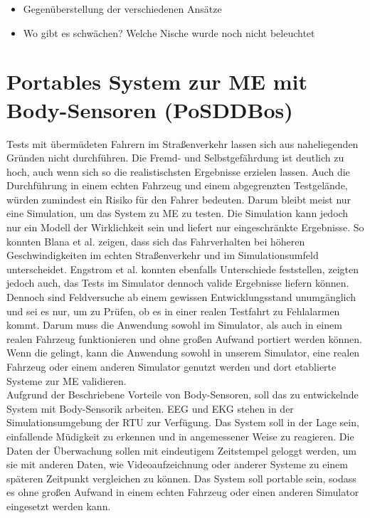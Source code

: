 {\begin{itemize}
  \item Gegenüberstellung der verschiedenen Ansätze
  \item Wo gibt es schwächen? Welche Nische wurde noch nicht beleuchtet
\end{itemize}

\section{Portables System zur \acl{ME} mit Body-Sensoren (PoSDDBos)}
\label{chap:prop}
Tests mit übermüdeten Fahrern im Straßenverkehr lassen sich aus naheliegenden Gründen nicht durchführen. Die Fremd- und Selbstgefährdung ist deutlich zu hoch, auch wenn sich so die realistischsten Ergebnisse erzielen lassen. Auch die Durchführung in einem echten Fahrzeug und einem abgegrenzten Testgelände, würden zumindest ein Risiko für den Fahrer bedeuten.
Darum bleibt meist nur eine Simulation, um das System zu \acl{ME} zu testen. Die Simulation kann jedoch nur ein Modell der Wirklichkeit sein und liefert nur eingeschränkte Ergebnisse. So konnten Blana et al. \cite{Blana_1} zeigen, dass sich das Fahrverhalten bei höheren Geschwindigkeiten im echten Straßenverkehr und im Simulationsumfeld unterscheidet. Engstrom et al.  \cite{Engstrom_2322937} konnten ebenfalls Unterschiede feststellen, zeigten jedoch auch, das Tests im Simulator dennoch valide Ergebnisse liefern können. \\

Dennoch sind Feldversuche ab einem gewissen Entwicklungsstand unumgänglich und sei es nur, um zu Prüfen, ob es in einer realen Testfahrt zu Fehlalarmen kommt. Darum muss die Anwendung sowohl im Simulator, als auch in einem realen Fahrzeug funktionieren und ohne großen Aufwand portiert werden können. Wenn die gelingt, kann die Anwendung sowohl in unserem Simulator, eine realen Fahrzeug oder einem anderen Simulator genutzt werden und dort etablierte Systeme zur \acl{ME} validieren.\\

Aufgrund der Beschriebene Vorteile von Body-Sensoren, soll das zu entwickelnde System mit Body-Sensorik arbeiten. EEG und EKG stehen in der Simulationsumgebung der \acl{RTU} zur Verfügung. Das System soll in der Lage sein, einfallende Müdigkeit zu erkennen und in angemessener Weise zu reagieren. Die Daten der Überwachung sollen mit eindeutigem Zeitstempel geloggt werden, um sie mit anderen Daten, wie Videoaufzeichnung oder anderer Systeme zu einem späteren Zeitpunkt vergleichen zu können. Das System soll portable sein, sodass es ohne großen Aufwand in einem echten Fahrzeug oder einen anderen Simulator eingesetzt werden kann.

}
